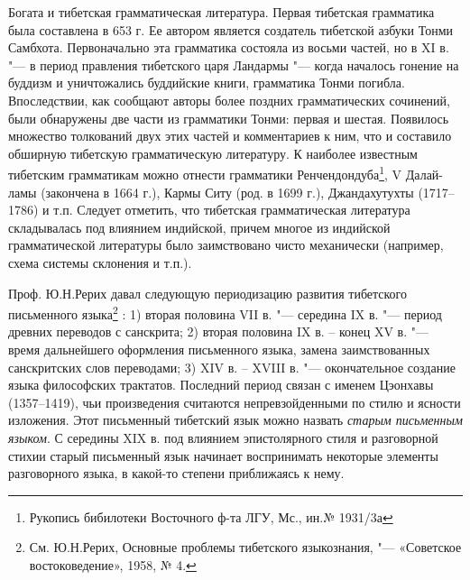 Богата и тибетская грамматическая литература. Первая тибетская грамматика была составлена в 653 г. Ее автором является создатель тибетской азбуки Тонми Самбхота. Первоначально эта грамматика состояла из восьми частей, но в XI в. "--- в период правления тибетского царя Ландармы  "--- когда началось гонение на буддизм и уничтожались буддийские книги, грамматика Тонми погибла. Впоследствии, как сообщают авторы более поздних грамматических сочинений, были обнаружены две части из грамматики Тонми: первая и шестая. Появилось множество толкований двух этих частей и комментариев к ним, что и составило обширную тибетскую грамматическую литературу. К наиболее известным тибетским грамматикам можно отнести грамматики Ренчендондуба\footnote[3]{Рукопись бибилотеки Восточного ф-та ЛГУ, Мс., ин.№ 1931/3а}, V Далай-ламы (закончена в 1664 г.), Кармы Ситу (род. в 1699 г.), Джандахутухты (1717--1786) и т.п. Следует отметить, что тибетская грамматическая литература складывалась под влиянием индийской, причем многое из индийской грамматической литературы было заимствовано чисто механически (например, схема системы склонения и т.п.).

Проф. Ю.Н.Рерих давал следующую периодизацию развития тибетского письменного языка\footnote[4]{См. Ю.Н.Рерих, Основные проблемы тибетского языкознания, "--- «Советское востоковедение», 1958, № 4.} : 1) вторая половина VII в. "--- середина IX в. "--- период древних переводов с санскрита; 2) вторая половина IX в. -- конец XV в. "--- время дальнейшего оформления письменного языка, замена заимствованных санскритских слов переводами; 3) XIV в. -- XVIII в. "--- окончательное создание языка философских трактатов. Последний период связан с именем Цэонхавы (1357--1419), чьи произведения считаются непревзойденными по стилю и ясности изложения. Этот письменный тибетский язык можно назвать \emph{старым письменным языком}. С середины XIX в. под влиянием эпистолярного стиля и разговорной стихии старый письменный язык начинает воспринимать некоторые элементы разговорного языка, в какой-то степени приближаясь к нему.

